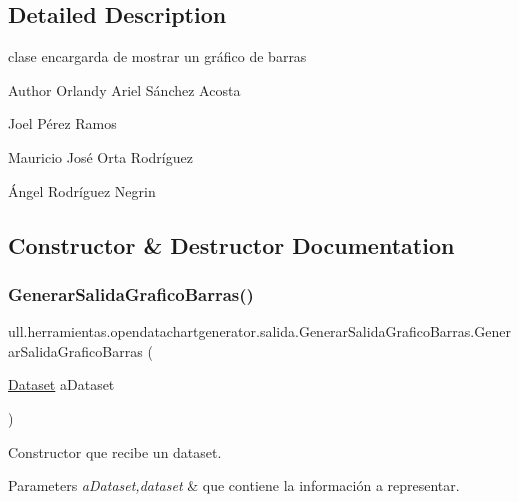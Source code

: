 \subsection{Detailed Description}
clase encargarda de mostrar un gráfico de barras 

\begin{DoxyAuthor}{Author}
Orlandy Ariel Sánchez Acosta 

Joel Pérez Ramos 

Mauricio José Orta Rodríguez 

Ángel Rodríguez Negrin 
\end{DoxyAuthor}


\subsection{Constructor \& Destructor Documentation}
\mbox{\label{classull_1_1herramientas_1_1opendatachartgenerator_1_1salida_1_1_generar_salida_grafico_barras_a3a7224ced863d8c519ef607c54a2d4c8}} 
\subsubsection{\texorpdfstring{Generar\+Salida\+Grafico\+Barras()}{GenerarSalidaGraficoBarras()}}
{\footnotesize\ttfamily ull.\+herramientas.\+opendatachartgenerator.\+salida.\+Generar\+Salida\+Grafico\+Barras.\+Generar\+Salida\+Grafico\+Barras (\begin{DoxyParamCaption}\item[{\mbox{\hyperlink{classull_1_1herramientas_1_1opendatachartgenerator_1_1_dataset}{Dataset}}}]{a\+Dataset }\end{DoxyParamCaption})}



Constructor que recibe un dataset. 


\begin{DoxyParams}{Parameters}
{\em a\+Dataset,dataset} & que contiene la información a representar. \\
\hline
\end{DoxyParams}



